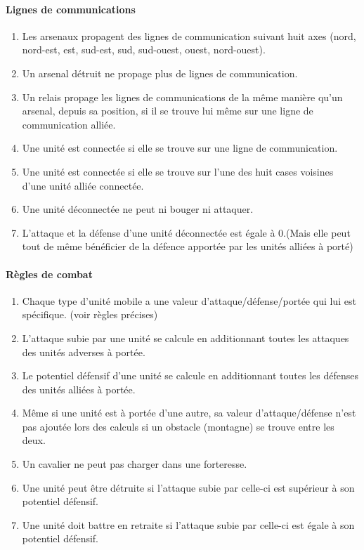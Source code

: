 		\paragraph{Lignes de communications}
		\begin{enumerate}
		\item Les arsenaux propagent des lignes de communication suivant huit axes (nord, nord-est, est, sud-est, sud, sud-ouest, ouest, nord-ouest).
		\item Un arsenal détruit ne propage plus de lignes de communication.
		\item Un relais propage les lignes de communications de la même manière qu'un arsenal, depuis sa position, si il se trouve lui même sur une ligne de communication alliée.
		\item Une unité est connectée si elle se trouve sur une ligne de communication.
		\item Une unité est connectée si elle se trouve sur l'une des huit cases voisines d'une unité alliée connectée.
		\item Une unité déconnectée ne peut ni bouger ni attaquer.
		\item L'attaque et la défense d'une unité déconnectée est égale à 0.(Mais elle peut tout de même bénéficier de la défence apportée par les unités alliées à porté)
		\end{enumerate}
		
		\paragraph{Règles de combat}
		\begin{enumerate}
		\item Chaque type d'unité mobile a une valeur d'attaque/défense/portée qui lui est spécifique. (voir règles précises)
		\item L'attaque subie par une unité se calcule en additionnant toutes les attaques des unités adverses à portée.
		\item Le potentiel défensif d'une unité se calcule en additionnant toutes les défenses des unités alliées à portée.
		\item Même si une unité est à portée d'une autre, sa valeur d'attaque/défense n'est pas ajoutée lors des calculs si un obstacle (montagne) se trouve entre les deux.
		\item Un cavalier ne peut pas charger dans une forteresse.
		\item Une unité peut être détruite si l'attaque subie par celle-ci est supérieur à son potentiel défensif.
		\item Une unité doit battre en retraite si l'attaque subie par celle-ci est égale à son potentiel défensif.
		\end{enumerate}
		
